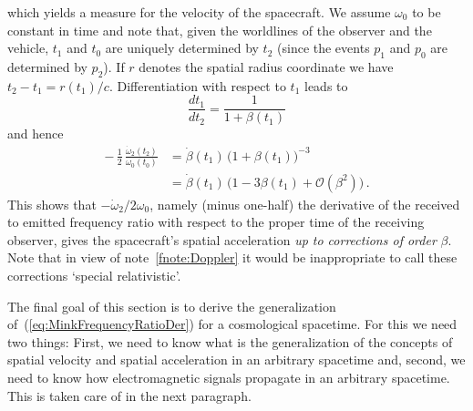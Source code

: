 \documentclass
[rmp,aps,twocolumn,showpacs,preprintnumbers,amsmath,amssymb]{revtex4}
\theoremstyle{plain}
\theoremstyle{definition}
\theoremstyle{remark}
\newcommand{\Ord}{\mathcal{O}}                %
\begin{document}
which yields a measure for the velocity of the spacecraft. We assume 
$\omega_0$ to be constant in time and note that, given the worldlines 
of the observer and the vehicle, $t_1$ and $t_0$ are uniquely determined 
by $t_2$ (since the events $p_1$ and $p_0$ are determined by $p_2$).  
If $r$ denotes the spatial radius coordinate we have 
$t_2-t_1=r(t_1)/c$. Differentiation with respect to $t_1$ leads to  
%
\begin{equation}\label{eq:MinkTimeDer}
  \frac{dt_1}{dt_2}=\frac{1}{1+\beta(t_1)}
\end{equation}
%
and hence 
%
\begin{equation}\label{eq:MinkFrequencyRatioDer}
\begin{split}
  -\,\frac{1}{2}\,\frac{\dot\omega_2(t_2)}{\omega_0(t_0)}
  & = \dot\beta(t_1)\,\bigl(1+\beta(t_1)\bigr)^{-3}\\
  & = \dot\beta(t_1)\,\bigl(1-3\beta(t_1) + \Ord(\beta^2)\bigr)\,.
\end{split}
\end{equation}
%
This shows that $-\dot\omega_2/2\omega_0$, namely (minus one-half) the 
derivative of the received to emitted frequency ratio with respect to the 
proper time of the receiving observer, gives the spacecraft's spatial 
acceleration \emph{up to corrections of order} $\beta$. Note that in 
view of note~\ref{fnote:Doppler} it would be inappropriate to call these
corrections `special relativistic'. 

The final goal of this section is to derive the generalization 
of~(\ref{eq:MinkFrequencyRatioDer}) for a cosmological spacetime. 
For this we need two things: First, we need to know what is the 
generalization of the concepts of spatial velocity and spatial acceleration 
in an arbitrary spacetime and, second, we need to know how electromagnetic 
signals propagate in an arbitrary spacetime. This is taken care of in the 
next paragraph.
\end{document}
